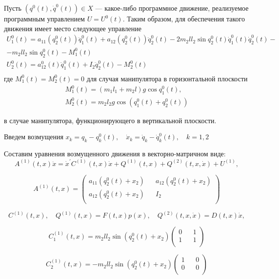 Пусть $(q^0(t), \dot q^0(t)) \in X$ --- какое-либо программное движение, реализуемое программным управлением $U = U^0(t).$ Таким образом, для обеспечения такого движения имеет место следующее управление
$$
\begin{array}{l}
U_1^0 (t) = a_{11} (q_2^0 (t)) \ddot q_1^0 (t) + a_{12} (q_2^0 (t)) \ddot q_2^0 (t) - 2 m_2 l l_2 \sin q_2^0 (t) \dot q_1^0 (t) \dot q_2^0 (t) - \\ 
- m_2 l l_2 \sin q_2^0 (t) - M_1^0 (t) \\
U_2^0 (t) = a_{12}^0 (t) \ddot q_1^0 (t) + I_2 \ddot q_2^0 (t) - M_2^0 (t) \\
\end{array}
$$
где $M_1^0(t) = M_2^0(t) = 0$ для случая манипулятора в горизонтальной плоскости
$$
\begin{array}{l}
M_1^0 (t) = (m_1 l_1 + m_2 l) g \cos q_1^0 (t), \\
M_2^0 (t) = m_2 l_2 g \cos (q_1^0 (t) + q_2^0 (t))
\end{array}
$$

в случае манипулятора, функционирующего в вертикальной плоскости.

Введем возмущения $x_k = q_k - q_k^0(t), \quad \dot x_k = \dot q_k - \dot q_k^0(t), \quad k = 1, 2$

Составим уравнения возмущенного движения в векторно-матричном виде:
\begin{equation}
A^{(1)}(t, x) \ddot x = {\dot x^{'} C^{(1)}(t, x) \dot x} + Q^{(1)}(t,x) + Q^{(2)}(t, x, \dot x) + U^{(1)}, \label{2.2'}
\end{equation}

$$A^{(1)}(t, x) =
\begin{pmatrix}
a_{11} (q_2^0 (t) + x_2) && a_{12} (q_2^0 (t) + x_2) \\
a_{12} (q_2^0 (t) + x_2) && I_2 \\
\end{pmatrix}$$

$$ C^{(1)}(t,x), \quad Q^{(1)}(t,x)=F(t,x)p(x), \quad Q^{(2)}(t,x,\dot x)=D(t,x)\dot x, $$

$$C_1^{(1)}(t, x) = m_2 l l_2 \sin (q_2^0 (t) + x_2)
\begin{pmatrix}
0 && 1\\
1 && 1\\
\end{pmatrix}$$

$$C_2^{(1)}(t, x) = - m_2 l l_2 \sin (q_2^0 (t) + x_2)
\begin{pmatrix}
1 && 0\\
0 && 0\\
\end{pmatrix}$$

